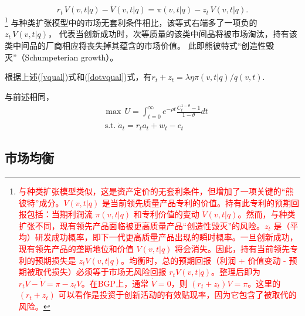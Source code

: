 \documentclass[cn,normal,11pt,black]{elegantnote}
\begin{document}
\begin{definition}[市场无套利条件]
    \begin{equation}\label{noprofitqual}
      r_t \, V(v,t|q) - \dot{V}(v,t|q) = \pi(v,t|q) - z_t \, V(v,t|q). 
    \end{equation}\footnote{\textcolor{red}{与种类扩张模型类似，这是资产定价的无套利条件，但增加了一项关键的“熊彼特”成分。$V(v,t|q)$ 是当前领先质量产品专利的价值。持有此专利的预期回报包括：当期利润流 $\pi(v,t|q)$ 和专利价值的变动 $\dot{V}(v,t|q)$。然而，与种类扩张不同，现有领先产品面临被更高质量产品“创造性毁灭”的风险。$z_t$ 是（平均）研发成功概率，即下一代更高质量产品出现的瞬时概率。一旦创新成功，现有领先产品的垄断地位和价值 $V(v,t|q)$ 将会消失。因此，持有当前领先专利的预期损失是 $z_t V(v,t|q)$。均衡时，总的预期回报（利润 + 价值变动 - 预期被取代损失）必须等于市场无风险回报 $r_t V(v,t|q)$。整理后即为 $r_t V - \dot{V} = \pi - z_t V$。在BGP上，通常 $\dot{V}=0$，则 $ (r_t+z_t)V = \pi$。这里的 $(r_t+z_t)$ 可以看作是投资于创新活动的有效贴现率，因为它包含了被取代的风险。}}
    与种类扩张模型中的市场无套利条件相比，该等式右端多了一项负的$z_t \, V(v,t|q)$，
    代表当创新成功时，次等质量的该类中间品将被市场淘汰，持有该类中间品的厂商相应将丧失掉其蕴含的市场价值。
    此即熊彼特式“创造性毁灭”（Schumpeterian growth）。
    
    根据上述(\ref{vqual})式和(\ref{dotvqual})式，有$r_t + z_t = \lambda \eta \pi(v,t|q) / q(v,t)$.
\end{definition}
\begin{definition}[个人效用函数]
    与前述相同，
    \begin{align}
        & \max \, U  = \int_{t=0}^{\infty} e^{-\rho t} \frac{C_t^{1-\theta} -1}{1-\theta} dt \\
        & \, \mathrm{s.t.} \; \dot{a}_t =  r_t a_t + w_t - c_t
    \end{align}
\end{definition}


\subsection{市场均衡}
\end{document}
